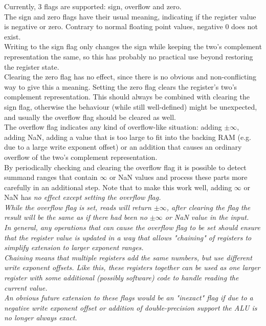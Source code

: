 Currently, 3 flags are supported: sign, overflow and zero.\\
The sign and zero flags have their usual meaning, indicating if
the register value is negative or zero. Contrary to normal floating
point values, negative 0 does not exist.\\
Writing to the sign flag only changes the sign while keeping the two's
complement representation the same, so this has probably no practical
use beyond restoring the register state.\\
Clearing the zero flag has no effect, since there is no obvious and non-conflicting
way to give this a meaning. Setting the zero flag clears the register's two's
complement representation. This should always be combined with clearing the sign
flag, otherwise the behaviour (while still well-defined) might be unexpected,
and usually the overflow flag should be cleared as well.\\
The overflow flag indicates any kind of overflow-like situation: adding $\pm\infty$,
adding NaN, adding a value that is too large to fit into the backing RAM (e.g. due
to a large write exponent offset) or an addition that causes an ordinary overflow
of the two's complement representation.\\
By periodically checking and clearing the overflow flag it is possible to
detect summand ranges that contain $\infty$ or NaN values and process these
parts more carefully in an additional step. Note that to make this work well,
adding $\infty$ or NaN has \em no \rm effect except setting the overflow flag.\\
While the overflow flag is set, reads will return $\pm\infty$, after clearing
the flag the result will be the same as if there had been no $\pm\infty$ or NaN
value in the input.\\
In general, any operations that can cause the overflow flag to be set should ensure
that the register value is updated in a way that allows "chaining" of registers
to simplify extension to larger exponent ranges.\\
Chaining means that multiple registers add the same numbers, but use different
write exponent offsets. Like this, these registers together can be used
as one larger register with some additional (possibly software) code to handle
reading the current value.\\
An obvious future extension to these flags would be an "inexact" flag if due to
a negative write exponent offset or addition of double-precision support the
ALU is no longer always exact.

